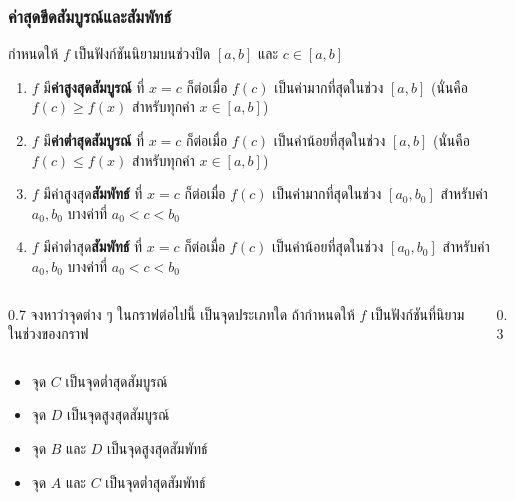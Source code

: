 \begin{frame}
\end{frame}


\begin{frame}
\frametitle{ค่าสุดขีดสัมบูรณ์และสัมพัทธ์}
\begin{defn}{}{}
กำหนดให้ $f$ เป็นฟังก์ชันนิยามบนช่วงปิด $[a,b]$ และ $c \in [a,b]$
\begin{enumerate}
\item $f$ มี\textbf{ค่าสูงสุดสัมบูรณ์} ที่ $x=c$ \pa ก็ต่อเมื่อ $f(c)$ เป็นค่ามากที่สุดในช่วง $[a,b]$ \pa (นั่นคือ $f(c) \geq f(x)$ สำหรับทุกค่า $x \in [a,b]$) 
\item $f$ มี\textbf{ค่าต่ำสุดสัมบูรณ์} ที่ $x=c$ \pa ก็ต่อเมื่อ $f(c)$ เป็นค่าน้อยที่สุดในช่วง $[a,b]$ \pa (นั่นคือ $f(c) \leq f(x)$ สำหรับทุกค่า $x \in [a,b]$)
\item $f$ มีค่าสูงสุด\textbf{สัมพัทธ์} ที่ $x=c$ \pa ก็ต่อเมื่อ $f(c)$ เป็นค่ามากที่สุดในช่วง $[a_0,b_0]$ สำหรับค่า $a_0, b_0$ บางค่าที่ $a_0 < c < b_0$  
\item $f$ มีค่าต่ำสุด\textbf{สัมพัทธ์} ที่ $x=c$ \pa ก็ต่อเมื่อ $f(c)$ เป็นค่าน้อยที่สุดในช่วง $[a_0,b_0]$ สำหรับค่า $a_0, b_0$ บางค่าที่ $a_0 < c < b_0$  
\end{enumerate}
\end{defn}
\end{frame}


\begin{frame}[t]
\begin{ex}
\begin{columns}
\begin{column}{0.7\textwidth}
จงหาว่าจุดต่าง ๆ ในกราฟต่อไปนี้ เป็นจุดประเภทใด ถ้ากำหนดให้ $f$ เป็นฟังก์ชันที่นิยามในช่วงของกราฟ
\end{column}
\begin{column}{0.3\textwidth}
\end{column}
\end{columns}
\end{ex}
\begin{sol}
\begin{itemize}
\item จุด $C$ เป็นจุดต่ำสุดสัมบูรณ์
\item จุด $D$ เป็นจุดสูงสุดสัมบูรณ์
\item จุด $B$ และ $D$ เป็นจุดสูงสุดสัมพัทธ์
\item จุด $A$ และ $C$ เป็นจุดต่ำสุดสัมพัทธ์
\end{itemize}
\end{sol}
\end{frame}

